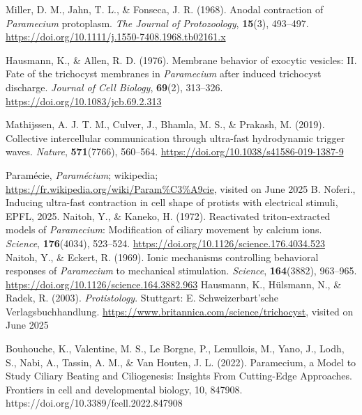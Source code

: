 \begin{thebibliography}{99}
Miller, D. M., Jahn, T. L., \& Fonseca, J. R. (1968). Anodal contraction of \textit{Paramecium} protoplasm. \textit{The Journal of Protozoology}, \textbf{15}(3), 493–497. \url{https://doi.org/10.1111/j.1550-7408.1968.tb02161.x}

Hausmann, K., \& Allen, R. D. (1976). Membrane behavior of exocytic vesicles: II. Fate of the trichocyst membranes in \textit{Paramecium} after induced trichocyst discharge. \textit{Journal of Cell Biology}, \textbf{69}(2), 313–326. \url{https://doi.org/10.1083/jcb.69.2.313}

Mathijssen, A. J. T. M., Culver, J., Bhamla, M. S., \& Prakash, M. (2019). Collective intercellular communication through ultra-fast hydrodynamic trigger waves. \textit{Nature}, \textbf{571}(7766), 560–564. \url{https://doi.org/10.1038/s41586-019-1387-9}

Paramécie, \textit{Paramécium}; wikipedia; \url{https://fr.wikipedia.org/wiki/Param%C3%A9cie}, visited on June 2025
B. Noferi., Inducing ultra-fast contraction in cell shape of protists with electrical stimuli, EPFL, 2025.
Naitoh, Y., \& Kaneko, H. (1972). Reactivated triton-extracted models of \textit{Paramecium}: Modification of ciliary movement by calcium ions. \textit{Science}, \textbf{176}(4034), 523–524. \url{https://doi.org/10.1126/science.176.4034.523}
Naitoh, Y., \& Eckert, R. (1969). Ionic mechanisms controlling behavioral responses of \textit{Paramecium} to mechanical stimulation. \textit{Science}, \textbf{164}(3882), 963–965. \url{https://doi.org/10.1126/science.164.3882.963}
Hausmann, K., Hülsmann, N., \& Radek, R. (2003). \textit{Protistology}. Stuttgart: E. Schweizerbart’sche Verlagsbuchhandlung.
\url{https://www.britannica.com/science/trichocyst}, visited on June 2025

Bouhouche, K., Valentine, M. S., Le Borgne, P., Lemullois, M., Yano, J., Lodh, S., Nabi, A., Tassin, A. M., & Van Houten, J. L. (2022). Paramecium, a Model to Study Ciliary Beating and Ciliogenesis: Insights From Cutting-Edge Approaches. Frontiers in cell and developmental biology, 10, 847908. https://doi.org/10.3389/fcell.2022.847908

\end{thebibliography}



